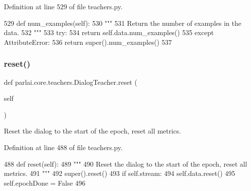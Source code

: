 Definition at line 529 of file teachers.\+py.


\begin{DoxyCode}
529     \textcolor{keyword}{def }num\_examples(self):
530         \textcolor{stringliteral}{"""}
531 \textcolor{stringliteral}{        Return the number of examples in the data.}
532 \textcolor{stringliteral}{        """}
533         \textcolor{keywordflow}{try}:
534             \textcolor{keywordflow}{return} self.data.num\_examples()
535         \textcolor{keywordflow}{except} AttributeError:
536             \textcolor{keywordflow}{return} super().num\_examples()
537 
\end{DoxyCode}
\mbox{\label{classparlai_1_1core_1_1teachers_1_1DialogTeacher_a393f94ea28e1733f575a9f36a0b43c18}} 
\subsubsection{\texorpdfstring{reset()}{reset()}}
{\footnotesize\ttfamily def parlai.\+core.\+teachers.\+Dialog\+Teacher.\+reset (\begin{DoxyParamCaption}\item[{}]{self }\end{DoxyParamCaption})}

\begin{DoxyVerb}Reset the dialog to the start of the epoch, reset all metrics.
\end{DoxyVerb}
 

Definition at line 488 of file teachers.\+py.


\begin{DoxyCode}
488     \textcolor{keyword}{def }reset(self):
489         \textcolor{stringliteral}{"""}
490 \textcolor{stringliteral}{        Reset the dialog to the start of the epoch, reset all metrics.}
491 \textcolor{stringliteral}{        """}
492         super().reset()
493         \textcolor{keywordflow}{if} self.stream:
494             self.data.reset()
495             self.epochDone = \textcolor{keyword}{False}
496 
\end{DoxyCode}
\mbox{\label{classparlai_1_1core_1_1teachers_1_1DialogTeacher_a55fc9dead757489e127ec1a872849376}} 
